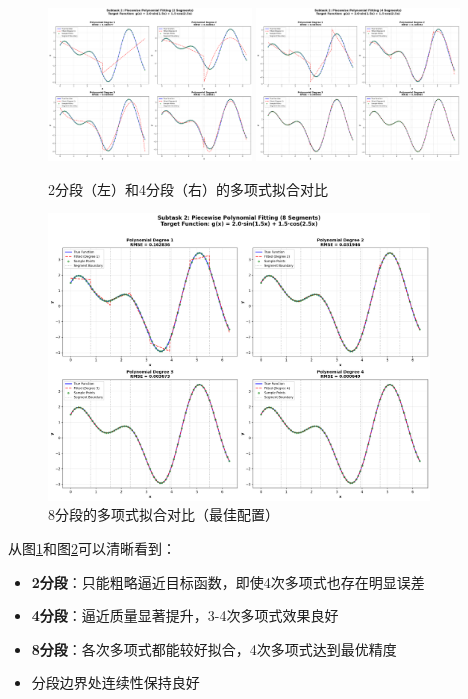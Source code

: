 \documentclass[a4paper,12pt]{article}
\theoremstyle{definition}
\begin{document}
\begin{figure}[H]
\centering
\includegraphics[width=0.48\textwidth]{results/task2/subtask2/comparison_2_segments.png}
\includegraphics[width=0.48\textwidth]{results/task2/subtask2/comparison_4_segments.png}
\caption{2分段（左）和4分段（右）的多项式拟合对比}
\label{fig:task2_subtask2_segments}
\end{figure}

\begin{figure}[H]
\centering
\includegraphics[width=0.9\textwidth]{results/task2/subtask2/comparison_8_segments.png}
\caption{8分段的多项式拟合对比（最佳配置）}
\label{fig:task2_subtask2_8seg}
\end{figure}

从图\ref{fig:task2_subtask2_segments}和图\ref{fig:task2_subtask2_8seg}可以清晰看到：
\begin{itemize}
    \item \textbf{2分段}：只能粗略逼近目标函数，即使4次多项式也存在明显误差
    \item \textbf{4分段}：逼近质量显著提升，3-4次多项式效果良好
    \item \textbf{8分段}：各次多项式都能较好拟合，4次多项式达到最优精度
    \item 分段边界处连续性保持良好
\end{itemize}
\end{document}
